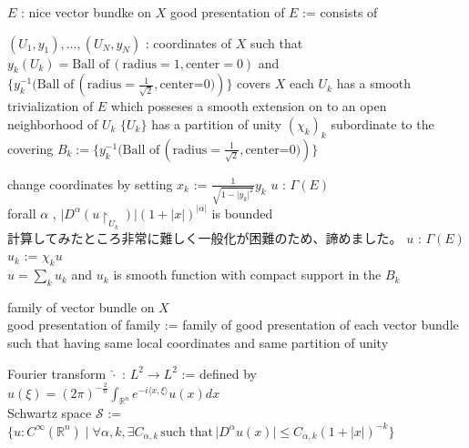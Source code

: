 \begin{Definition}
\itemwhen
  \Fix \(E\) : nice vector bundke on \(X\)
\itemdefi
  \Define good presentation of \(E\) := consists of
  \begin{itemize}
    \itemenum \((U_1 , y_1) , \ldots , (U_N , y_N)\) : coordinates of \(X\) such that \(y_k(U_k) = \text{Ball of} \, (\text{radius} = 1 , \text{center} = 0)\) and \(\{y_k^{-1}(\text{Ball of} \, (\text{radius}=\frac{1}{\sqrt{2}},\text{center=0)})\}\) covers \(X\)
    \itemenum each \(U_k\) has a smooth trivialization of \(E\) which posseses a smooth extension on to an open neighborhood of \(U_k\)
    \itemenum \(\{U_k\}\) has a partition of unity \((\chi_k)_k\) subordinate to the covering \(B_k := \{y_k^{-1}(\text{Ball of} \, (\text{radius}=\frac{1}{\sqrt{2}},\text{center=0)})\}\)
  \end{itemize}
\itemdefi
  \Let change coordinates by setting \(x_k\) := \(\frac{1}{\sqrt{1-\lvert y_k \rvert ^2}} y_k\)
\itemprop
  \For \(u\) : \(\Gamma(E)\) \\
  \Then forall \(\alpha\) , \(\lvert D^\alpha (u \restriction_{U_k}) \rvert (1 + \lvert x \rvert)^{\lvert \alpha \rvert}\) is bounded
\itemprof
  \SORRY \\
  計算してみたところ非常に難しく一般化が困難のため、諦めました。
\itemprop
  \For \(u\) : \(\Gamma(E)\) \\
  \Let \(u_k\) := \(\chi_k u\) \\
  \Then \(u = \sum_k u_k\) and \(u_k\) is smooth function with compact support in the \(B_k\)
\end{Definition}

\begin{Definition}
\itemdefi
  \For family of vector bundle on \(X\) \\
  \Define good presentation of family := family of good presentation of each vector bundle such that having same local coordinates and same partition of unity
\end{Definition}

\begin{Definition}
\itemdefi
  \Define Fourier transform \(\hat{\cdot}\) : \(L^2 \to L^2\) := defined by
  \(\hat{u}(\xi) = (2 \pi)^{- \frac{2}{n}} \int_{\mathbb{R}^n} e^{- i \langle x , \xi \rangle} u(x) dx\) \\
  \Define Schwartz space \(\mathscr{S}\) := \(\{u : C^{\infty}(\mathbb{R}^n) \mid \forall \alpha , k , \exists C_{\alpha,k} \, \text{such that} \, \lvert D^\alpha u(x) \rvert \leq C_{\alpha , k} (1 + \lvert x \rvert)^{-k}\}\)
\end{Definition}

